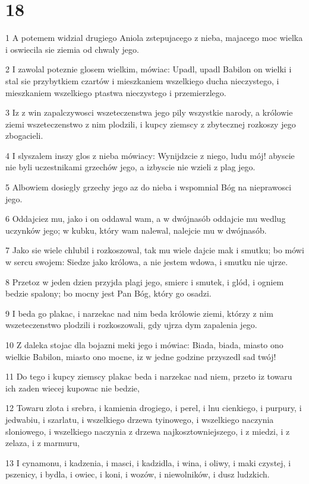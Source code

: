 \chapter{18}

\par 1 A potemem widzial drugiego Aniola zstepujacego z nieba, majacego moc wielka i oswiecila sie ziemia od chwaly jego.
\par 2 I zawolal poteznie glosem wielkim, mówiac: Upadl, upadl Babilon on wielki i stal sie przybytkiem czartów i mieszkaniem wszelkiego ducha nieczystego, i mieszkaniem wszelkiego ptastwa nieczystego i przemierzlego.
\par 3 Iz z win zapalczywosci wszeteczenstwa jego pily wszystkie narody, a królowie ziemi wszeteczenstwo z nim plodzili, i kupcy ziemscy z zbytecznej rozkoszy jego zbogacieli.
\par 4 I slyszalem inszy glos z nieba mówiacy: Wynijdzcie z niego, ludu mój! abyscie nie byli uczestnikami grzechów jego, a izbyscie nie wzieli z plag jego.
\par 5 Albowiem dosiegly grzechy jego az do nieba i wspomnial Bóg na nieprawosci jego.
\par 6 Oddajciez mu, jako i on oddawal wam, a w dwójnasób oddajcie mu wedlug uczynków jego; w kubku, który wam nalewal, nalejcie mu w dwójnasób.
\par 7 Jako sie wiele chlubil i rozkoszowal, tak mu wiele dajcie mak i smutku; bo mówi w sercu swojem: Siedze jako królowa, a nie jestem wdowa, i smutku nie ujrze.
\par 8 Przetoz w jeden dzien przyjda plagi jego, smierc i smutek, i glód, i ogniem bedzie spalony; bo mocny jest Pan Bóg, który go osadzi.
\par 9 I beda go plakac, i narzekac nad nim beda królowie ziemi, którzy z nim wszeteczenstwo plodzili i rozkoszowali, gdy ujrza dym zapalenia jego.
\par 10 Z daleka stojac dla bojazni meki jego i mówiac: Biada, biada, miasto ono wielkie Babilon, miasto ono mocne, iz w jedne godzine przyszedl sad twój!
\par 11 Do tego i kupcy ziemscy plakac beda i narzekac nad niem, przeto iz towaru ich zaden wiecej kupowac nie bedzie,
\par 12 Towaru zlota i srebra, i kamienia drogiego, i perel, i lnu cienkiego, i purpury, i jedwabiu, i szarlatu, i wszelkiego drzewa tyinowego, i wszelkiego naczynia sloniowego, i wszelkiego naczynia z drzewa najkosztowniejszego, i z miedzi, i z zelaza, i z marmuru,
\par 13 I cynamonu, i kadzenia, i masci, i kadzidla, i wina, i oliwy, i maki czystej, i pszenicy, i bydla, i owiec, i koni, i wozów, i niewolników, i dusz ludzkich.
